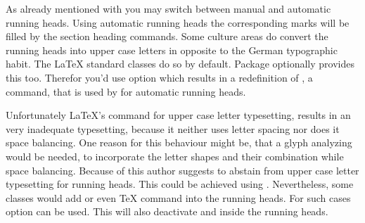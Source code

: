 \ifshortversion\IgnoreThistrue{}\fi
\ifIgnoreThis %
\else %
\begin{Declaration}
\end{Declaration}
%
As already mentioned with  you may switch between manual and
automatic running heads. Using automatic running heads the corresponding marks
will be filled by the section heading commands. Some culture areas do convert
the running heads into upper case letters in opposite to the German
typographic habit. The \LaTeX{} standard classes do so by default. Package
 optionally provides this too. Therefor you'd use option
 which results in a redefinition of
, a command, that is
used by  for automatic running heads.

Unfortunately \LaTeX's command for upper case letter typesetting,
 results in an very inadequate
typesetting, because it neither uses letter spacing nor does it space
balancing. One reason for this behaviour might be, that a glyph analyzing
would be needed, to incorporate the letter shapes and their combination while
space balancing. Because of this \KOMAScript{} author suggests to abstain from
upper case letter typesetting for running heads. This could be achieved using
. Nevertheless, some classes would add
 or even \TeX{} command  into the
running heads. For such cases option  can be
used. This will also deactivate  and 
inside the running heads.

